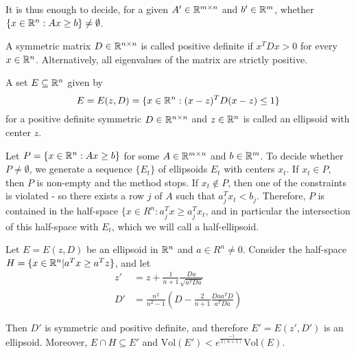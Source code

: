 It is thus enough to decide, for a given $A' \in \mathbb{R}^{m \times n}$ and
$b' \in \mathbb{R}^{m}$, whether $\{ x \in \mathbb{R}^{n} : Ax \geq b \} \neq
\emptyset$.

\begin{defn}
  \label{defn:complexity_of_linear_programming:2}
  A symmetric matrix $D \in \mathbb{R}^{n \times n}$ is called positive
  definite if $x^{T} D x > 0$ for every $x \in \mathbb{R}^{n}$.
  Alternatively, all eigenvalues of the matrix are strictly positive.
\end{defn}

\begin{defn}
  \label{defn:complexity_of_linear_programming:3}
  A set $E \subseteq \mathbb{R}^{n}$ given by
  \begin{equation}
    \label{eq:31}
    E = E(z, D) = \{ x \in \mathbb{R}^{n} : (x - z)^{T} D(x - z)\leq 1 \}
  \end{equation} for a positive definite symmetric $D \in \mathbb{R}^{n \times
    n}$ and $z \in \mathbb{R}^{n}$ is called an ellipsoid with center $z$.
\end{defn}

Let $P = \{ x \in \mathbb{R}^{n} : Ax \geq b \}$ for some $A \in \mathbb{R}^{m \times
  n}$ and $b \in \mathbb{R}^{m}$.  To decide whether $P \neq \emptyset$, we
generate a sequence $\{ E_{t} \}$ of ellipsoids $E_{t}$ with centers
$x_{t}$.  If $x_{t} \in P$, then $P$ is non-empty and the method
stops.  If $x_{t} \notin P$, then one of the constraints is violated -
so there exists a row $j$ of $A$ such that $a_{j}^{T} x_{t} < b_{j}$.
Therefore, $P$ is contained in the half-space $\{ x \in R^{n} :
a_{j}^{T} x \geq a_{j}^{T} x_{t}$, and in particular the intersection
of this half-space with $E_{t}$, which we will call a half-ellipsoid.

\begin{thm}
  \label{defn:complexity_of_linear_programming:4}
  Let $E = E(z, D)$ be an ellipsoid in $\mathbb{R}^{n}$ and $a \in R^{n} \neq
  0$.  Consider the half-space $H = \{ x \in \mathbb{R}^{n} | a^{T} x \geq
  a^{T} z \}$, and  let
  \begin{align}
    \label{eq:32}
    z' &= z + \frac{1}{n+1} \frac{Da}{\sqrt{a^{T}Da}} \\
    D' &= \frac{n^{2}}{n^{2} - 1} \left( D  -
      \frac{2}{n+1}\frac{Daa^{T}D}{a^{T}Da} \right)
  \end{align}

  Then $D'$ is symmetric and positive definite, and therefore $E' =
  E(z', D')$ is an ellipsoid.  Moreover, $E \cap H \subseteq E'$ and
  $\text{Vol}(E') < e^{\frac{-1}{2(n+1)}} \text{Vol}(E)$.
\end{thm}



